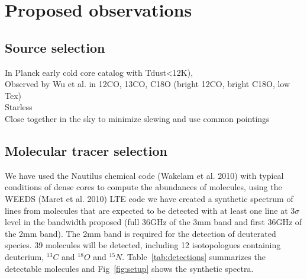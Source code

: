 \section{Proposed observations}
\subsection{Source selection}
  In Planck early cold core catalog with Tdust<12K),\\
  Observed by Wu et al. in 12CO, 13CO, C18O (bright 12CO, bright C18O, low Tex)\\
  Starless\\
  Close together in the sky to minimize slewing and use common pointings
\subsection{Molecular tracer selection}
  We have used the Nautilus chemical code (Wakelam et al. 2010) with typical conditions of dense cores to compute the abundances of molecules, using the WEEDS (Maret et al. 2010) LTE code we have created a synthetic spectrum of lines from molecules that are expected to be detected with at least one line at 3$\sigma$ level in the bandwidth proposed (full 36GHz of the 3mm band and first 36GHz of the 2mm band). The 2mm band is required for the detection of deuterated species. 39 molecules will be detected, including 12 isotopologues containing deuterium, $^{13}C$ and $^{18}O$ and $^{15}N$. Table~\ref{tab:detections} summarizes the detectable molecules and Fig~\ref{fig:setup} shows the synthetic spectra.
  

  
  
  
  
  
  
  
  
  